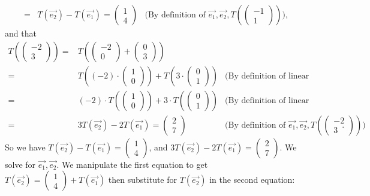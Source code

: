 \documentclass[12pt]{article}
\newenvironment{problem}[2][Problem]
{
	\begin{trivlist} 
		\item[\hskip \labelsep {\bfseries #1 #2:}]
	}
{
	\end{trivlist}
	}
\newenvironment{solution}[1][Solution]
{
	\begin{trivlist} 
		\item[\hskip \labelsep {\itshape #1:}]
	}
	{
	\end{trivlist}
}
\begin{document}
\begin{problem}{6}
\begin{solution}
\begin{align*}
=&T(\vec{e_{2}})-T(\vec{e_{1}})=\begin{pmatrix}1\\4\end{pmatrix}& \text{(By definition of $\vec{e_{1}},\vec{e_{2}}, T\left(\begin{pmatrix}-1\\1\end{pmatrix}\right)$)} \text{,}
\end{align*}
and that
\begin{align*}
T\left(\begin{pmatrix}-2\\3\end{pmatrix}\right) =& T\left( \begin{pmatrix}-2\\0\end{pmatrix} + \begin{pmatrix}0\\3\end{pmatrix}\right) &\\
=&T\left( (-2)\cdot \begin{pmatrix}1\\0\end{pmatrix} \right)+ T\left(3\cdot \begin{pmatrix}0\\1\end{pmatrix}\right) & \text{(By definition of linear transformation)}\\
=&(-2)\cdot T\left(\begin{pmatrix}1\\0\end{pmatrix} \right)+ 3\cdot T\left(\begin{pmatrix}0\\1\end{pmatrix}\right) & \text{(By definition of linear transformation)}\\
=& 3T(\vec{e_{2}}) - 2 T(\vec{e_{1}})= \begin{pmatrix}2\\7\end{pmatrix} & \text{(By definition of $\vec{e_{1}},\vec{e_{2}},T\left(\begin{pmatrix}-2\\3\end{pmatrix}\right) $)}\text{.}
\end{align*}
So we have $T(\vec{e_{2}})-T(\vec{e_{1}})=\begin{pmatrix}1\\4\end{pmatrix}$, and $3T(\vec{e_{2}}) - 2 T(\vec{e_{1}})= \begin{pmatrix}2\\7\end{pmatrix}$. We solve for $\vec{e_{1}},\vec{e_{2}}$. We manipulate the first equation to get $T(\vec{e_{2}})=\begin{pmatrix}1\\4\end{pmatrix}+T(\vec{e_{1}})$ then substitute for $T(\vec{e_{2}})$ in the second equation:

\end{solution}
\end{problem}
\end{document}
